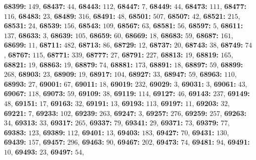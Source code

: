 \textsf{\bfseries 68399:} $149$, \textsf{\bfseries 68437:} $44$, \textsf{\bfseries 68443:} $112$, \textsf{\bfseries 68447:} $7$, \textsf{\bfseries 68449:} $44$, \textsf{\bfseries 68473:} $111$, \textsf{\bfseries 68477:} $116$, \textsf{\bfseries 68483:} $23$, \textsf{\bfseries 68489:} $316$, \textsf{\bfseries 68491:} $48$, \textsf{\bfseries 68501:} $507$, \textsf{\bfseries 68507:} $42$, \textsf{\bfseries 68521:} $215$, \textsf{\bfseries 68531:} $24$, \textsf{\bfseries 68539:} $156$, \textsf{\bfseries 68543:} $109$, \textsf{\bfseries 68567:} $63$, \textsf{\bfseries 68581:} $56$, \textsf{\bfseries 68597:} $5$, \textsf{\bfseries 68611:} $137$, \textsf{\bfseries 68633:} $3$, \textsf{\bfseries 68639:} $105$, \textsf{\bfseries 68659:} $60$, \textsf{\bfseries 68669:} $18$, \textsf{\bfseries 68683:} $59$, \textsf{\bfseries 68687:} $161$, \textsf{\bfseries 68699:} $11$, \textsf{\bfseries 68711:} $482$, \textsf{\bfseries 68713:} $86$, \textsf{\bfseries 68729:} $12$, \textsf{\bfseries 68737:} $20$, \textsf{\bfseries 68743:} $38$, \textsf{\bfseries 68749:} $74$, \textsf{\bfseries 68767:} $115$, \textsf{\bfseries 68771:} $339$, \textsf{\bfseries 68777:} $27$, \textsf{\bfseries 68791:} $227$, \textsf{\bfseries 68813:} $19$, \textsf{\bfseries 68819:} $165$, \textsf{\bfseries 68821:} $19$, \textsf{\bfseries 68863:} $19$, \textsf{\bfseries 68879:} $74$, \textsf{\bfseries 68881:} $173$, \textsf{\bfseries 68891:} $18$, \textsf{\bfseries 68897:} $59$, \textsf{\bfseries 68899:} $268$, \textsf{\bfseries 68903:} $23$, \textsf{\bfseries 68909:} $19$, \textsf{\bfseries 68917:} $104$, \textsf{\bfseries 68927:} $33$, \textsf{\bfseries 68947:} $59$, \textsf{\bfseries 68963:} $110$, \textsf{\bfseries 68993:} $27$, \textsf{\bfseries 69001:} $67$, \textsf{\bfseries 69011:} $18$, \textsf{\bfseries 69019:} $232$, \textsf{\bfseries 69029:} $3$, \textsf{\bfseries 69031:} $3$, \textsf{\bfseries 69061:} $43$, \textsf{\bfseries 69067:} $118$, \textsf{\bfseries 69073:} $59$, \textsf{\bfseries 69109:} $38$, \textsf{\bfseries 69119:} $114$, \textsf{\bfseries 69127:} $46$, \textsf{\bfseries 69143:} $237$, \textsf{\bfseries 69149:} $48$, \textsf{\bfseries 69151:} $17$, \textsf{\bfseries 69163:} $32$, \textsf{\bfseries 69191:} $13$, \textsf{\bfseries 69193:} $113$, \textsf{\bfseries 69197:} $11$, \textsf{\bfseries 69203:} $32$, \textsf{\bfseries 69221:} $7$, \textsf{\bfseries 69233:} $102$, \textsf{\bfseries 69239:} $263$, \textsf{\bfseries 69247:} $3$, \textsf{\bfseries 69257:} $276$, \textsf{\bfseries 69259:} $257$, \textsf{\bfseries 69263:} $34$, \textsf{\bfseries 69313:} $33$, \textsf{\bfseries 69317:} $265$, \textsf{\bfseries 69337:} $79$, \textsf{\bfseries 69341:} $29$, \textsf{\bfseries 69371:} $73$, \textsf{\bfseries 69379:} $77$, \textsf{\bfseries 69383:} $123$, \textsf{\bfseries 69389:} $112$, \textsf{\bfseries 69401:} $13$, \textsf{\bfseries 69403:} $183$, \textsf{\bfseries 69427:} $70$, \textsf{\bfseries 69431:} $130$, \textsf{\bfseries 69439:} $157$, \textsf{\bfseries 69457:} $296$, \textsf{\bfseries 69463:} $90$, \textsf{\bfseries 69467:} $202$, \textsf{\bfseries 69473:} $74$, \textsf{\bfseries 69481:} $94$, \textsf{\bfseries 69491:} $10$, \textsf{\bfseries 69493:} $23$, \textsf{\bfseries 69497:} $54$, 

